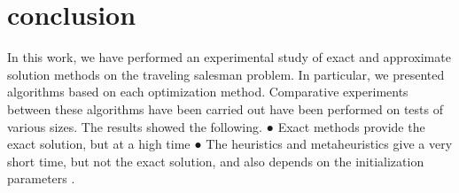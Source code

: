 
\section{conclusion}

In this work, we have performed an experimental study of exact and approximate solution methods on the traveling salesman problem. In particular, we presented algorithms based on each optimization method. Comparative experiments between these algorithms have been carried out
have been performed on tests of various sizes. The results showed the following.
● Exact methods provide the exact solution, but at a high time
● The heuristics and metaheuristics give a very short time, but not the exact solution, and also depends on the initialization parameters .